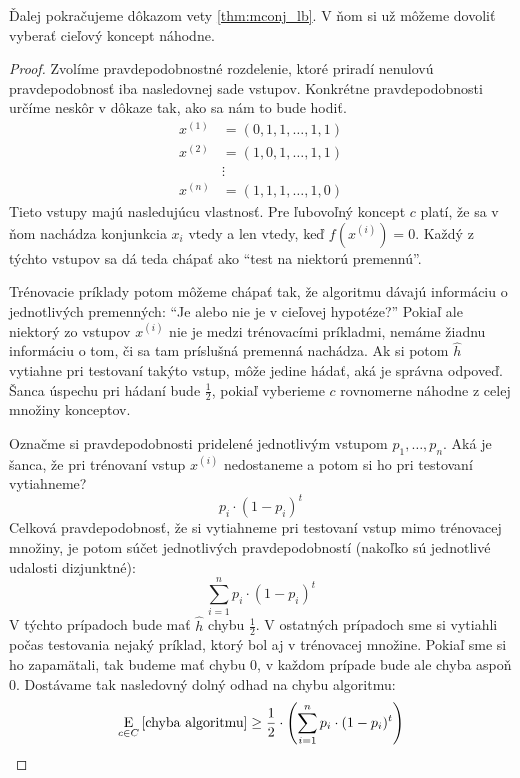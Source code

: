 Ďalej pokračujeme dôkazom vety \ref{thm:mconj_lb}. V ňom si už môžeme
dovoliť vyberať cieľový koncept náhodne.

\begin{proof}
  Zvolíme pravdepodobnostné rozdelenie, ktoré priradí nenulovú
  pravdepodobnosť iba nasledovnej sade vstupov. Konkrétne
  pravdepodobnosti určíme neskôr v dôkaze tak, ako sa nám to bude hodiť.
  \begin{align}
    x^{(1)} &= (0, 1, 1, \ldots, 1, 1) \\
    x^{(2)} &= (1, 0, 1, \ldots, 1, 1) \\
            &\vdots \\
    x^{(n)} &= (1, 1, 1, \ldots, 1, 0)
  \end{align}
  Tieto vstupy majú nasledujúcu vlastnosť. Pre ľubovoľný koncept $c$
  platí, že sa v ňom nachádza konjunkcia $x_i$ vtedy a len vtedy, keď
  $f(x^{(i)}) = 0$. Každý z týchto vstupov sa dá teda chápať ako
  ``test na niektorú premennú''.
  
  Trénovacie príklady potom môžeme chápať tak, že algoritmu dávajú
  informáciu o jednotlivých premenných: ``Je alebo nie je v cieľovej
  hypotéze?'' Pokiaľ ale niektorý zo vstupov $x^{(i)}$ nie je medzi
  trénovacími príkladmi, nemáme žiadnu informáciu o tom, či sa tam
  príslušná premenná nachádza. Ak si potom $\hat{h}$ vytiahne pri
  testovaní takýto vstup, môže jedine hádať, aká je správna odpoveď.
  Šanca úspechu pri hádaní bude $\frac{1}{2}$, pokiaľ vyberieme $c$
  rovnomerne náhodne z celej množiny konceptov.
  
  Označme si pravdepodobnosti pridelené jednotlivým vstupom $p_1, \ldots, p_n$.
  Aká je šanca, že pri trénovaní vstup $x^{(i)}$ nedostaneme a potom si ho
  pri testovaní vytiahneme?
  $$p_i \cdot (1 - p_i)^t$$
  Celková pravdepodobnosť, že si vytiahneme pri testovaní vstup mimo
  trénovacej množiny, je potom súčet jednotlivých pravdepodobností
  (nakoľko sú jednotlivé udalosti dizjunktné):
  $$\sum_{i=1}^n p_i \cdot (1 - p_i)^t$$
  V týchto prípadoch bude mať $\hat{h}$ chybu $\frac{1}{2}$. V ostatných
  prípadoch sme si vytiahli počas testovania nejaký príklad, ktorý bol aj
  v trénovacej množine. Pokiaľ sme si ho zapamätali, tak budeme mať chybu
  $0$, v každom prípade bude ale chyba aspoň $0$. Dostávame tak nasledovný
  dolný odhad na chybu algoritmu:
  $$ \operatorname*{\mathrm{E}}_{c \in C} \left[ \text{\normalfont chyba algoritmu} \right] \geq \frac{1}{2} \cdot \left( \sum_{i=1}^n p_i \cdot (1 - p_i)^t \right) $$
  

\end{proof}
